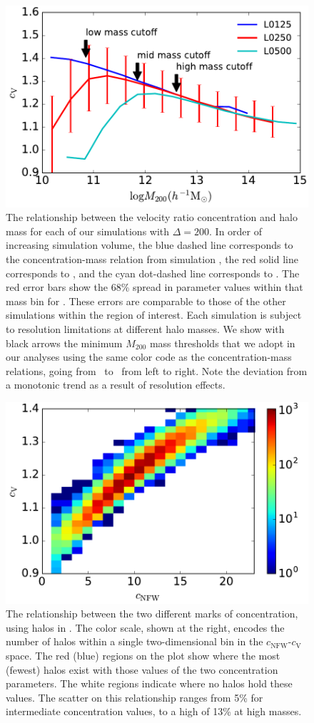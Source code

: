 \documentclass[usenatbib]{mnras}
\begin{document}
\begin{figure}
\centering
\includegraphics[width=.5\textwidth]{masscut_cV_d200.pdf}
\caption{The relationship between the velocity ratio concentration and halo mass for each of our simulations with $\Delta =200$. 
In order of increasing simulation volume, the blue dashed line corresponds to the concentration-mass relation from simulation 
\simA, the red solid line corresponds to \simB, and the cyan dot-dashed line corresponds to \simC. The red error bars show the 68\% spread in
parameter values within that mass bin for \simB. These errors are comparable to those of the other simulations
within the region of interest.
Each simulation is subject to resolution limitations at different halo masses. We show with black arrows 
the minimum $M_{200}$ mass thresholds that we adopt in our analyses using the same color code as 
the concentration-mass relations, going from \simA \ to \simC \ from left to right. Note the deviation from a monotonic trend as a result of resolution effects.
}
\label{fig:cvrelation}
\end{figure}

\begin{figure}
\centering
\includegraphics[width=.5\textwidth]{cvvscnfw_relation.pdf}
\caption{
The relationship between the two different marks of concentration, 
using halos in \simB. The color scale, shown at the right, encodes the number of halos 
within a single two-dimensional bin in the $c_{\mathrm{NFW}}$-$c_{\mathrm{V}}$ space. 
The red (blue) regions on the plot show where the most (fewest) halos exist with those values of the two
concentration parameters. The white regions indicate where no halos hold these values. The scatter on this relationship ranges from 5\% for intermediate concentration values, to a high of 13\% at high masses.
}
\label{fig:concentrations}
\end{figure}
\end{document}
